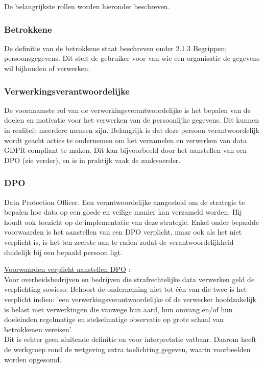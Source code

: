 De belangrijkste rollen worden hieronder beschreven. 

\subsubsection{Betrokkene}
De definitie van de betrokkene staat beschreven onder 2.1.3 Begrippen; persoonsgegevens. Dit stelt de gebruiker voor van wie een organisatie de gegevens wil bijhouden of verwerken. 

\subsubsection{Verwerkingsverantwoordelijke}
De voornaamste rol van de verwerkingsverantwoordelijke is het bepalen van de doelen en motivatie voor het verwerken van de persoonlijke gegevens. Dit kunnen in realiteit meerdere mensen zijn. Belangrijk is dat deze persoon verantwoordelijk wordt geacht acties te ondernemen om het verzamelen en verwerken van data GDPR-compliant te maken. 
Dit kan bijvoorbeeld door het aanstellen van een DPO (zie verder), en is in praktijk vaak de zaakvoerder.  

\subsubsection{DPO}
Data Protection Officer. Een verantwoordelijke aangesteld om de strategie te bepalen hoe data op een goede en veilige manier kan verzameld worden. Hij houdt ook toezicht op de implementatie van deze strategie.
Enkel onder bepaalde voorwaarden is het aanstellen van een DPO verplicht, maar ook als het niet verplicht is, is het ten zeerste aan te raden zodat de verantwoordelijkheid duidelijk bij een bepaald persoon ligt. 

\underline{Voorwaarden verplicht aanstellen DPO} :  \\
Voor overheidsbedrijven en bedrijven die strafrechtelijke data verwerken geld de verplichting sowieso. Behoort de onderneming niet tot één van die twee is het verplicht indien: 'een verwerkingsverantwoordelijke of de verwerker hoofdzakelijk is belast met verwerkingen die vanwege hun aard, hun omvang en/of hun doeleinden regelmatige en stelselmatige observatie op grote schaal van betrokkenen vereisen'. \textcite{ConXioN2017} \\
Dit is echter geen sluitende definitie en voor interpretatie vatbaar. Daarom heeft de werkgroep rond de wetgeving extra toelichting gegeven, waarin voorbeelden worden opgesomd. 

